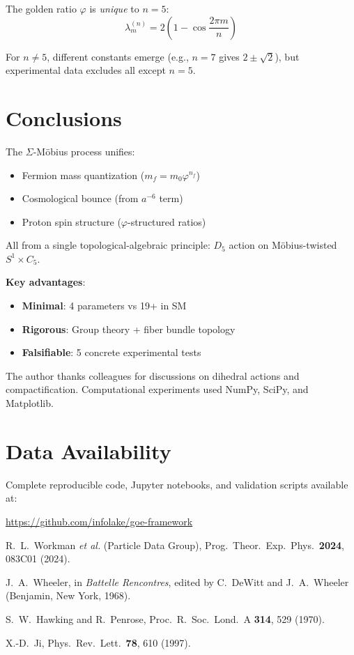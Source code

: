 \documentclass[twocolumn,preprintnumbers,amsmath,amssymb,superscriptaddress]{revtex4-2}
\newcommand{\Dfive}{D_5}
\newcommand{\Cfive}{C_5}
\newcommand{\varphig}{\varphi}
\begin{document}
The golden ratio $\varphig$ is \textit{unique} to $n=5$:
\begin{equation}
\lambda_m^{(n)} = 2\left(1 - \cos\frac{2\pi m}{n}\right)
\end{equation}

For $n \neq 5$, different constants emerge (e.g., $n=7$ gives $2 \pm \sqrt{2}$), but experimental data excludes all except $n=5$.

\section{Conclusions}

The $\Sigma$-M\"obius process unifies:
\begin{itemize}
\item Fermion mass quantization ($m_f = m_0 \varphig^{n_f}$)
\item Cosmological bounce (from $a^{-6}$ term)
\item Proton spin structure ($\varphig$-structured ratios)
\end{itemize}

All from a single topological-algebraic principle: $\Dfive$ action on M\"obius-twisted $S^1 \times \Cfive$.

\textbf{Key advantages}:
\begin{itemize}
\item \textbf{Minimal}: 4 parameters vs 19+ in SM
\item \textbf{Rigorous}: Group theory + fiber bundle topology
\item \textbf{Falsifiable}: 5 concrete experimental tests
\end{itemize}

\begin{acknowledgments}
The author thanks colleagues for discussions on dihedral actions and compactification. Computational experiments used NumPy, SciPy, and Matplotlib.
\end{acknowledgments}

\section*{Data Availability}
Complete reproducible code, Jupyter notebooks, and validation scripts available at:
\begin{center}
\url{https://github.com/infolake/goe-framework}
\end{center}

\begin{thebibliography}{99}

 R.\ L.\ Workman \textit{et al.} (Particle Data Group), Prog.\ Theor.\ Exp.\ Phys.\ \textbf{2024}, 083C01 (2024).

 J.\ A.\ Wheeler, in \textit{Battelle Rencontres}, edited by C.\ DeWitt and J.\ A.\ Wheeler (Benjamin, New York, 1968).

 S.\ W.\ Hawking and R.\ Penrose, Proc.\ R.\ Soc.\ Lond.\ A \textbf{314}, 529 (1970).

 X.-D.\ Ji, Phys.\ Rev.\ Lett.\ \textbf{78}, 610 (1997).

\end{thebibliography}
\end{document}
